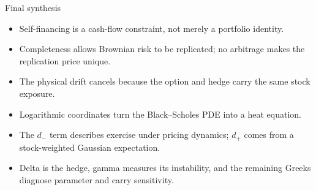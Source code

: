 \documentclass[10pt]{article}
\newcommand{\1}{\mathbf 1}
\theoremstyle{definition}
\begin{document}
\begin{keyidea}{Final synthesis}
\begin{itemize}
  \item Self-financing is a cash-flow constraint, not merely a portfolio
        identity.
  \item Completeness allows Brownian risk to be replicated; no arbitrage makes
        the replication price unique.
  \item The physical drift cancels because the option and hedge carry the same
        stock exposure.
  \item Logarithmic coordinates turn the Black--Scholes PDE into a heat
        equation.
  \item The \(d_-\) term describes exercise under pricing dynamics; \(d_+\)
        comes from a stock-weighted Gaussian expectation.
  \item Delta is the hedge, gamma measures its instability, and the remaining
        Greeks diagnose parameter and carry sensitivity.
\end{itemize}
\end{keyidea}
\end{document}
